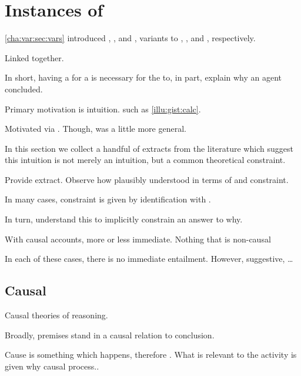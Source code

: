 \chapter{Instances of \issueConstraint{}}
\label{cha:clar:sec:literature}

\begin{note}
  \autoref{cha:var:sec:vars} introduced \qWhyV{}, \qHowV{}, and \issueConstraint{}, variants to \qWhy{}, \qHow{}, and \issueInclusion{}, respectively.

  Linked together.

  In short, having a  for a \ros{} is necessary for the \ros{} to, in part, explain why an agent concluded.

  Primary motivation is intuition.
   such as \autoref{illu:gist:calc}.

  Motivated via \citeauthor{Davidson:1963aa}.
  Though, \citeauthor{Davidson:1963aa} was a little more general.

  In this section we collect a handful of extracts from the literature which suggest this intuition is not merely an intuition, but a common theoretical constraint.

  Provide extract.
  Observe how plausibly understood in terms of \wit{} and constraint.

  In many cases, constraint is given by identification with \wit{}.

  In turn, understand this to implicitly constrain an answer to why.

  With causal accounts, more or less immediate.
  Nothing that is non-causal
\end{note}

\begin{note}
  In each of these cases, there is no immediate entailment.
  However, suggestive, \dots
\end{note}


\section{Causal}
\label{cha:clar:sec:literature:causal}

\begin{note}
  Causal theories of reasoning.

  Broadly, premises stand in a causal relation to conclusion.

  Cause is something which happens, therefore \wit{}.
  What is relevant to the activity is given why causal process..
\end{note}

